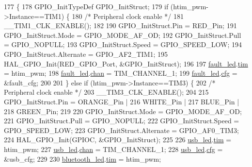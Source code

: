 \begin{DoxyCode}
177 \{
178     GPIO\_InitTypeDef GPIO\_InitStruct;
179     \textcolor{keywordflow}{if} (htim\_pwm->Instance==TIM1) \{
180         \textcolor{comment}{/* Peripheral clock enable */}
181         \_\_TIM1\_CLK\_ENABLE();
182   
190         GPIO\_InitStruct.Pin = RED\_Pin;
191         GPIO\_InitStruct.Mode = GPIO\_MODE\_AF\_OD;
192         GPIO\_InitStruct.Pull = GPIO\_NOPULL;
193         GPIO\_InitStruct.Speed = GPIO\_SPEED\_LOW;
194         GPIO\_InitStruct.Alternate = GPIO\_AF2\_TIM1;
195         HAL\_GPIO\_Init(RED\_GPIO\_Port, &GPIO\_InitStruct);
196 
197         \mbox{\hyperlink{group___s_d___l_e_d___exported___variables_ga282f37361758642f972e789019cf2692}{fault\_led}}.\mbox{\hyperlink{structsd__led_a6e46bfc6fae939f8fc5ee53ea4551f18}{tim}} = htim\_pwm;
198         \mbox{\hyperlink{group___s_d___l_e_d___exported___variables_ga282f37361758642f972e789019cf2692}{fault\_led}}.\mbox{\hyperlink{structsd__led_afb67f3e4e204785118073a96b76614d6}{chan}} = TIM\_CHANNEL\_1;
199         \mbox{\hyperlink{group___s_d___l_e_d___exported___variables_ga282f37361758642f972e789019cf2692}{fault\_led}}.\mbox{\hyperlink{structsd__led_acaf3272a1f93d49be9ec4c31804252e6}{cfg}} = &fault\_cfg;
200 
201     \} \textcolor{keywordflow}{else} \textcolor{keywordflow}{if} (htim\_pwm->Instance==TIM3) \{
202         \textcolor{comment}{/* Peripheral clock enable */}
203         \_\_TIM3\_CLK\_ENABLE();
204   
215         GPIO\_InitStruct.Pin = ORANGE\_Pin |
216                       WHITE\_Pin |
217                       BLUE\_Pin |
218                       GREEN\_Pin;
219         
220         GPIO\_InitStruct.Mode = GPIO\_MODE\_AF\_OD;
221         GPIO\_InitStruct.Pull = GPIO\_NOPULL;
222         GPIO\_InitStruct.Speed = GPIO\_SPEED\_LOW;
223         GPIO\_InitStruct.Alternate = GPIO\_AF0\_TIM3;
224         HAL\_GPIO\_Init(GPIOC, &GPIO\_InitStruct);
225 
226         \mbox{\hyperlink{group___s_d___l_e_d___exported___variables_ga19ed39428c591574b7c023c924f70a47}{usb\_led}}.\mbox{\hyperlink{structsd__led_a6e46bfc6fae939f8fc5ee53ea4551f18}{tim}} = htim\_pwm;
227         \mbox{\hyperlink{group___s_d___l_e_d___exported___variables_ga19ed39428c591574b7c023c924f70a47}{usb\_led}}.\mbox{\hyperlink{structsd__led_afb67f3e4e204785118073a96b76614d6}{chan}} = TIM\_CHANNEL\_1;
228         \mbox{\hyperlink{group___s_d___l_e_d___exported___variables_ga19ed39428c591574b7c023c924f70a47}{usb\_led}}.\mbox{\hyperlink{structsd__led_acaf3272a1f93d49be9ec4c31804252e6}{cfg}} = &usb\_cfg;
229 
230         \mbox{\hyperlink{group___s_d___l_e_d___exported___variables_ga1135853c32bde3f26e5f4e59a1fc688d}{bluetooth\_led}}.\mbox{\hyperlink{structsd__led_a6e46bfc6fae939f8fc5ee53ea4551f18}{tim}} = htim\_pwm;

\end{DoxyCode}
